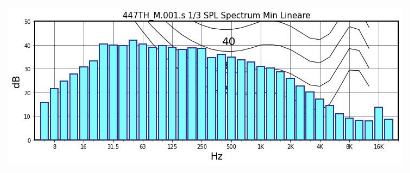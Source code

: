 \documentclass[11pt]{article}
\begin{document}

\vspace{-0.2cm}

\begin{figure}[!htb]
\centering
     \includegraphics[width=0.93\textwidth]{-SPL!min!plot-}%
\end{figure}
\end{document}
